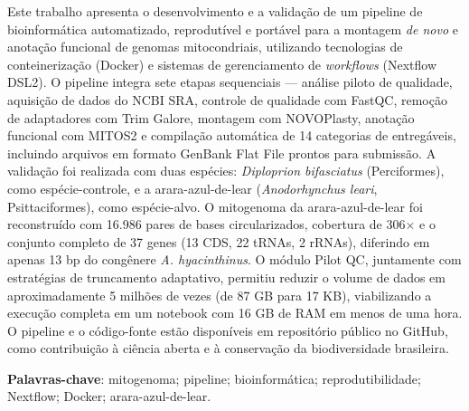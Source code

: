 \documentclass[
    12pt,               %
    openright,          %
    oneside,            %
    a4paper,            %
    chapter=TITLE,      %
    section=TITLE,      %
    english,            %
    brazil,             %
    final               %
]{abntex2}
\begin{document}



\begin{resumo}
    Este trabalho apresenta o desenvolvimento e a validação de um pipeline de bioinformática automatizado, reprodutível e portável para a montagem \textit{de novo} e anotação funcional de genomas mitocondriais, utilizando tecnologias de conteinerização (Docker) e sistemas de gerenciamento de \textit{workflows} (Nextflow DSL2). O pipeline integra sete etapas sequenciais --- análise piloto de qualidade, aquisição de dados do NCBI SRA, controle de qualidade com FastQC, remoção de adaptadores com Trim Galore, montagem com NOVOPlasty, anotação funcional com MITOS2 e compilação automática de 14 categorias de entregáveis, incluindo arquivos em formato GenBank Flat File prontos para submissão. A validação foi realizada com duas espécies: \textit{Diploprion bifasciatus} (Perciformes), como espécie-controle, e a arara-azul-de-lear (\textit{Anodorhynchus leari}, Psittaciformes), como espécie-alvo. O mitogenoma da arara-azul-de-lear foi reconstruído com 16.986 pares de bases circularizados, cobertura de 306$\times$ e o conjunto completo de 37 genes (13 CDS, 22 tRNAs, 2 rRNAs), diferindo em apenas 13 bp do congênere \textit{A. hyacinthinus}. O módulo Pilot QC, juntamente com estratégias de truncamento adaptativo, permitiu reduzir o volume de dados em aproximadamente 5 milhões de vezes (de 87 GB para 17 KB), viabilizando a execução completa em um notebook com 16 GB de RAM em menos de uma hora. O pipeline e o código-fonte estão disponíveis em repositório público no GitHub, como contribuição à ciência aberta e à conservação da biodiversidade brasileira.

    \vspace{\onelineskip}
    \noindent
    \textbf{Palavras-chave}: mitogenoma; pipeline; bioinformática; reprodutibilidade; Nextflow; Docker; arara-azul-de-lear.
\end{resumo}
\end{document}
